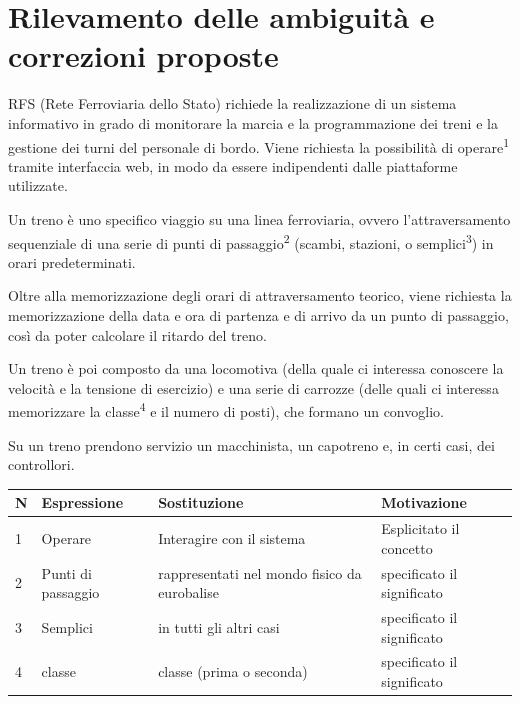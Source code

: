 \documentclass[a4paper,12pt]{report}
\begin{document}
	\section{Rilevamento delle ambiguità e correzioni proposte}
	\par RFS (Rete Ferroviaria dello Stato) richiede la realizzazione di un sistema informativo in grado di monitorare la marcia e la programmazione dei treni e la gestione dei turni del personale di bordo. Viene richiesta la possibilità di operare\textsuperscript{1} tramite interfaccia web, in modo da essere indipendenti dalle piattaforme utilizzate.
	\par Un treno è uno specifico viaggio su una linea ferroviaria, ovvero l'attraversamento sequenziale di una serie di punti di passaggio\textsuperscript{2} (scambi, stazioni, o semplici\textsuperscript{3}) in orari predeterminati.
	\par Oltre alla memorizzazione degli orari di attraversamento teorico, viene richiesta la memorizzazione della data e ora di partenza e di arrivo da un punto di passaggio, così da poter calcolare il ritardo del treno.
	\par Un treno è poi composto da una locomotiva (della quale ci interessa conoscere la velocità e la tensione di esercizio) e una serie di carrozze (delle quali ci interessa memorizzare la classe\textsuperscript{4} e il numero di posti), che formano un convoglio.
	\par Su un treno prendono servizio un macchinista, un capotreno e, in certi casi, dei controllori.

	\begin{longtable}{|p{1cm}|p{3cm}|p{4cm}|p{4cm}|}
		\hline
		\textbf{N} & \textbf{Espressione} & \textbf{Sostituzione} & \textbf{Motivazione} \\ \hline
		\endhead
		1 & Operare & Interagire con il sistema & Esplicitato il concetto  \\ \hline
		2 & Punti di passaggio & rappresentati nel mondo fisico da eurobalise & specificato il significato \\ \hline
		3 & Semplici & in tutti gli altri casi & specificato il significato \\ \hline
		4 & classe & classe (prima o seconda) & specificato il significato \\ \hline
	\end{longtable}
\end{document}
